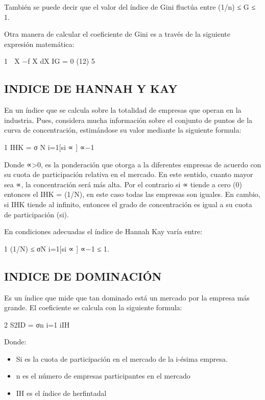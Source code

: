 \documentclass[
  letterpaper,
  DIV=11,
  numbers=noendperiod]{scrartcl}
\begin{document}
También se puede decir que el valor del índice de Gini fluctúa entre
(1/n) ≤ G ≤ 1.

Otra manera de calcular el coeficiente de Gini es a través de la
siguiente expresión matemática:

1 ׬ X −f X dX IG = 0 (12) 5

\hypertarget{indice-de-hannah-y-kay}{%
\subsection{INDICE DE HANNAH Y KAY}\label{indice-de-hannah-y-kay}}

En un índice que se calcula sobre la totalidad de empresas que operan en
la industria. Pues, considera mucha información sobre el conjunto de
puntos de la curva de concentración, estimándose su valor mediante la
siguiente formula:

1 IHK = σ N i=1{[}si ∝ {]} ∝−1

Donde ∝\textgreater0, es la ponderación que otorga a la diferentes
empresas de acuerdo con su cuota de participación relativa en el
mercado. En este sentido, cuanto mayor sea ∝, la concentración será más
alta. Por el contrario si ∝ tiende a cero (0) entonces el IHK = (1/N),
en este caso todas las empresas son iguales. En cambio, si IHK tiende al
infinito, entonces el grado de concentración es igual a su cuota de
participación (si).

En condiciones adecuadas el índice de Hannah Kay varía entre:

1 (1/N) ≤ σN i=1{[}si ∝ {]} ∝−1 ≤ 1.

\hypertarget{indice-de-dominaciuxf3n}{%
\subsection{INDICE DE DOMINACIÓN}\label{indice-de-dominaciuxf3n}}

Es un índice que mide que tan dominado está un mercado por la empresa
más grande. El coeficiente se calcula con la siguiente formula:

2 S2ID = σn i=1 iIH

Donde:

\begin{itemize}
\item
  Si es la cuota de participación en el mercado de la i-ésima empresa.
\item
  n es el número de empresas participantes en el mercado
\item
  IH es el índice de herfintadal
\end{itemize}
\end{document}
